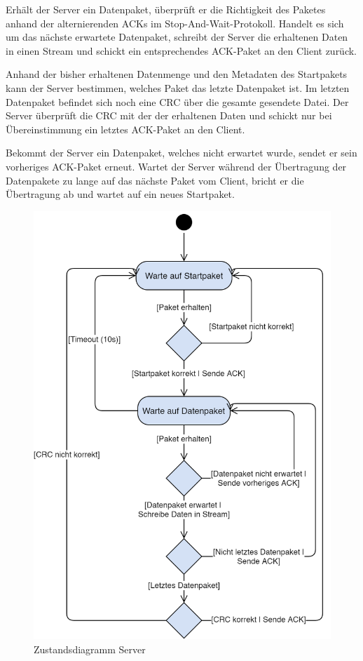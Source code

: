 \documentclass{article}
\begin{document}
		Erhält der Server ein Datenpaket, überprüft er die Richtigkeit des Paketes anhand der alternierenden ACKs im Stop-And-Wait-Protokoll. Handelt es sich um das nächste erwartete Datenpaket, schreibt der Server die erhaltenen Daten in einen Stream und schickt ein entsprechendes ACK-Paket an den Client zurück.

		Anhand der bisher erhaltenen Datenmenge und den Metadaten des Startpakets kann der Server bestimmen, welches Paket das letzte Datenpaket ist. Im letzten Datenpaket befindet sich noch eine CRC über die gesamte gesendete Datei. Der Server überprüft die CRC mit der der erhaltenen Daten und schickt nur bei Übereinstimmung ein letztes ACK-Paket an den Client.

		Bekommt der Server ein Datenpaket, welches nicht erwartet wurde, sendet er sein vorheriges ACK-Paket erneut. Wartet der Server während der Übertragung der Datenpakete zu lange auf das nächste Paket vom Client, bricht er die Übertragung ab und wartet auf ein neues Startpaket.

		\begin{figure}
			\centering
			\includegraphics[scale=0.3]{zustandsdiagramm_server.png}
			\caption{Zustandsdiagramm Server}
		\end{figure}
\end{document}
